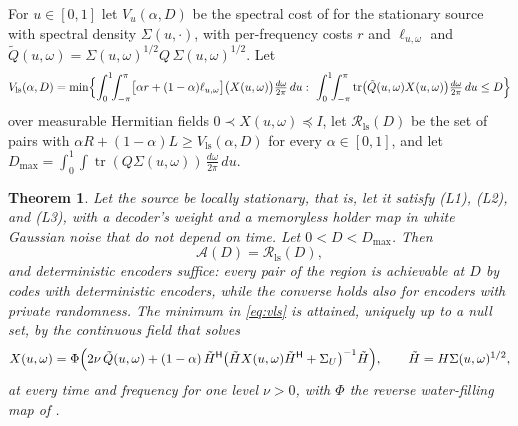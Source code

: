 \documentclass[11pt,onecolumn]{IEEEtran}
\newtheorem{theorem}{Theorem}
\newcommand{\tr}{\operatorname{tr}}
\newcommand{\dw}{\tfrac{d\omega}{2\pi}}
\newcommand{\herm}{\mathsf H}
\newcommand{\Vls}{V_{\mathrm{ls}}}
\begin{document}
For $u\in[0,1]$ let $V_u(\alpha,D)$ be the spectral cost of
\cite{part2} for the stationary source with spectral density
$\Sigma(u,\cdot)$, with per-frequency costs $r$ and $\ell_{u,\omega}$
and $\tilde Q(u,\omega)=\Sigma(u,\omega)^{1/2}Q\,\Sigma(u,\omega)^{1/2}$. Let
\begin{equation}
\Vls(\alpha,D)=\min\Bigl\{\int_0^1\!\!\int_{-\pi}^{\pi}\bigl[\alpha r+(1-\alpha)\ell_{u,\omega}\bigr]\bigl(X(u,\omega)\bigr)\dw\,du:\
\int_0^1\!\!\int_{-\pi}^{\pi}\tr\bigl(\tilde Q(u,\omega)X(u,\omega)\bigr)\dw\,du\le D\Bigr\}
\label{eq:vls}
\end{equation}
over measurable Hermitian fields $0\prec X(u,\omega)\preceq I$, let
$\mathcal R_{\mathrm{ls}}(D)$ be the set of pairs with
$\alpha R+(1-\alpha)L\ge\Vls(\alpha,D)$ for every $\alpha\in[0,1]$, and
let $D_{\max}=\int_0^1\!\int\tr(Q\Sigma(u,\omega))\,\dw\,du$.

\begin{theorem}\label{thm:ls}
Let the source be locally stationary, that is, let it satisfy (L1),
(L2), and (L3), with a decoder's weight and a memoryless holder map in
white Gaussian noise that do not depend on time. Let $0<D<D_{\max}$.
Then
\[
\mathcal A(D)=\mathcal R_{\mathrm{ls}}(D),
\]
and deterministic encoders suffice: every pair of the region is
achievable at $D$ by codes with deterministic encoders, while the
converse holds also for encoders with private randomness.
The minimum in \eqref{eq:vls} is attained, uniquely up to a null set,
by the continuous field that solves
\[
X(u,\omega)=\Phi\Bigl(2\nu\,\tilde Q(u,\omega)+(1-\alpha)\,\tilde H^{\herm}\bigl(\tilde HX(u,\omega)\tilde H^{\herm}+\Sigma_U\bigr)^{-1}\tilde H\Bigr),\qquad\tilde H=H\Sigma(u,\omega)^{1/2},
\]
at every time and frequency for one level $\nu>0$, with $\Phi$ the
reverse water-filling map of \cite{part2}.
\end{theorem}
\end{document}

